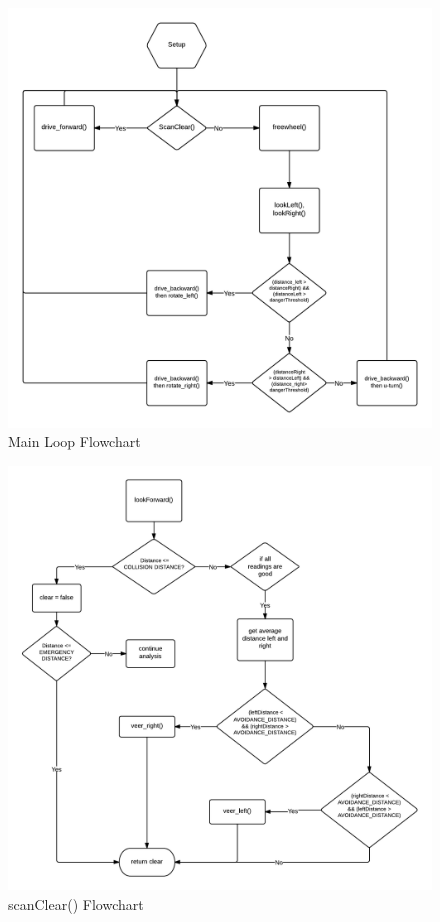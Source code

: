 \documentclass[11pt]{article}
\begin{document}
	\begin{figure}[b]\centering
	\includegraphics[height=0.85\textwidth]{images/main.png}
	\caption{Main Loop Flowchart}
		\label{main}
	\end{figure}


	\begin{figure}[b]\centering
	\includegraphics[height=0.85\textwidth]{images/scan_clear.png}
	\caption{scanClear() Flowchart}
		\label{scan}
	\end{figure}
	
\end{document}
